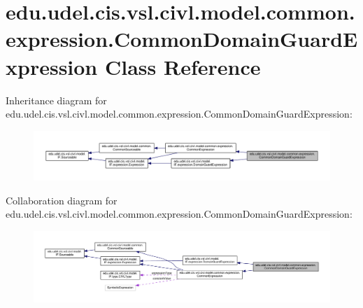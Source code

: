 \hypertarget{classedu_1_1udel_1_1cis_1_1vsl_1_1civl_1_1model_1_1common_1_1expression_1_1CommonDomainGuardExpression}{}\section{edu.\+udel.\+cis.\+vsl.\+civl.\+model.\+common.\+expression.\+Common\+Domain\+Guard\+Expression Class Reference}
\label{classedu_1_1udel_1_1cis_1_1vsl_1_1civl_1_1model_1_1common_1_1expression_1_1CommonDomainGuardExpression}


Inheritance diagram for edu.\+udel.\+cis.\+vsl.\+civl.\+model.\+common.\+expression.\+Common\+Domain\+Guard\+Expression\+:
\nopagebreak
\begin{figure}[H]
\begin{center}
\leavevmode
\includegraphics[width=350pt]{classedu_1_1udel_1_1cis_1_1vsl_1_1civl_1_1model_1_1common_1_1expression_1_1CommonDomainGuardExpression__inherit__graph}
\end{center}
\end{figure}


Collaboration diagram for edu.\+udel.\+cis.\+vsl.\+civl.\+model.\+common.\+expression.\+Common\+Domain\+Guard\+Expression\+:
\nopagebreak
\begin{figure}[H]
\begin{center}
\leavevmode
\includegraphics[width=350pt]{classedu_1_1udel_1_1cis_1_1vsl_1_1civl_1_1model_1_1common_1_1expression_1_1CommonDomainGuardExpression__coll__graph}
\end{center}
\end{figure}
